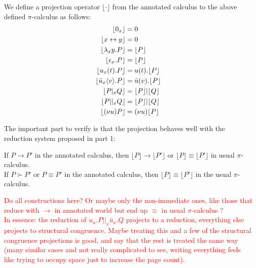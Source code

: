 \begin{definition}
We define a projection operator $\lfloor\cdot\rfloor$ from the annotated calculus to the above defined $\pi$-calculus as follows:\\
\begin{align*}
\lfloor 0_x \rfloor &= 0 \\
\lfloor x \leftrightarrow y \rfloor &= 0 \\
\lfloor \lambda_xy.P \rfloor &= \lfloor P \rfloor \\
\lfloor \epsilon_x.P \rfloor &= \lfloor P \rfloor \\
\lfloor u_x(t).P \rfloor &= u(t).\lfloor P \rfloor \\
\lfloor \bar{u}_x\langle v\rangle.P \rfloor &= \bar{u}(v).\lfloor P \rfloor \\
\lfloor P |_x Q \rfloor &= \lfloor P \rfloor | \lfloor Q \rfloor \\
\lfloor P ||_x Q \rfloor &= \lfloor P \rfloor | \lfloor Q \rfloor \\
\lfloor (\nu u)P \rfloor &= (\nu u)\lfloor P \rfloor
\end{align*}
\end{definition}

The important part to verify is that the projection behaves well with the reduction system proposed in part 1:

\begin{proposition}
If $P \to P'$ in the annotated calculus, then $\lfloor P \rfloor \to \lfloor P' \rfloor$ or $\lfloor P \rfloor \equiv \lfloor P' \rfloor$ in usual $\pi$-calculus.\\
If $P \succ P'$ or $P \equiv P'$ in the annotated calculus, then $\lfloor P \rfloor \equiv \lfloor P' \rfloor$ in the usual $\pi$-calculus.
\end{proposition}

\begin{myproof}
\textcolor{red}{Do all constructions here? Or maybe only the non-immediate ones, like those that reduce with $\to$ in annotated world but end up $\equiv$ in usual $\pi$-calculus ?\\
In essence: the reduction of $u_x.P||_x\bar{u}_x.Q$ projects to a reduction, everything else projects to structural congruence. Maybe treating this and a few of the structural congruence projections is good, and say that the rest is treated the same way (many similar cases and not really complicated to see, writing everything feels like trying to occupy space just to increase the page count).} %
\end{myproof}

